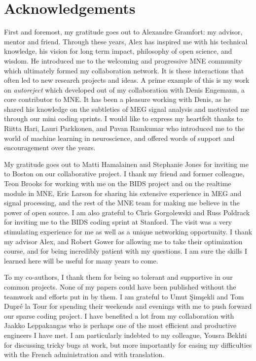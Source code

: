 \chapter*{Acknowledgements}
First and foremost, my gratitude goes out to Alexandre Gramfort: my advisor, mentor and friend. Through these years, Alex has inspired me with his technical knowledge, his vision for long term impact, philosophy of open science, and wisdom. He introduced me to the welcoming and progressive MNE community which ultimately formed my collaboration network. It is these interactions that often led to new research projects and ideas. A prime example of this is my work on \emph{autoreject} which developed out of my collaboration with Denis Engemann, a core contributor to MNE. It has been a pleasure working with Denis, as he shared his knowledge on the subtleties of MEG signal analysis and motivated me through our mini coding sprints. I would like to express my heartfelt thanks to Riitta Hari, Lauri Parkkonen, and Pavan Ramkumar who introduced me to the world of machine learning in neuroscience, and offered words of support and encouragement over the years. 

My gratitude goes out to Matti Hamalainen and Stephanie Jones for inviting me to Boston on our collaborative project. I thank my friend and former colleague, Teon Brooks for working with me on the BIDS project and on the realtime module in MNE, Eric Larson for sharing his extensive experience in MEG and signal processing, and the rest of the MNE team for making me believe in the power of open source. I am also grateful to Chris Gorgolewski and Russ Poldrack for inviting me to the BIDS coding sprint at Stanford. The visit was a very stimulating experience for me as well as a unique networking opportunity. I thank my advisor Alex, and Robert Gower for allowing me to take their optimization course, and for being incredibly patient with my questions. I am sure the skills I learned here will be useful for many years to come.

To my co-authors, I thank them for being so tolerant and supportive in our common projects. None of my papers could have been published without the teamwork and efforts put in by them. I am grateful to Umut \c{S}im\c{s}ekli and Tom Dupr\'{e} la Tour for spending their weekends and evenings with me to push forward our sparse coding project. I have benefited a lot from my collaboration with Jaakko Leppakangas who is perhaps one of the most efficient and productive engineers I have met. I am particularly indebted to my colleague, Yousra Bekhti for discussing tricky bugs at work, but more importantly for easing my difficulties with the French administration and with translation.

